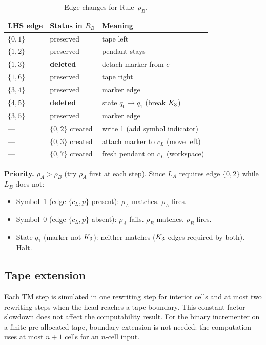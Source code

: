 \documentclass{../shared/primo}
\begin{document}
\begin{table}[ht]
\centering
\begin{tabular}{lll}
\toprule
LHS edge & Status in $R_B$ & Meaning \\
\midrule
$\{0,1\}$ & preserved & tape left \\
$\{1,2\}$ & preserved & pendant stays \\
$\{1,3\}$ & \textbf{deleted} & detach marker from $c$ \\
$\{1,6\}$ & preserved & tape right \\
$\{3,4\}$ & preserved & marker edge \\
$\{4,5\}$ & \textbf{deleted} & state $q_0 \to q_1$ (break $K_{3}$) \\
$\{3,5\}$ & preserved & marker edge \\
---      & $\{0,2\}$ created & write 1 (add symbol indicator) \\
---      & $\{0,3\}$ created & attach marker to $c_L$ (move left) \\
---      & $\{0,7\}$ created & fresh pendant on $c_L$ (workspace) \\
\bottomrule
\end{tabular}
\caption{Edge changes for Rule~$\rho_B$.}
\label{tab:ruleB}
\end{table}

\textbf{Priority.} $\rho_A > \rho_B$ (try $\rho_A$ first at each step). Since $L_A$ requires edge $\{0,2\}$ while $L_B$ does not:
\begin{itemize}
\item Symbol~1 (edge $\{c_L, p\}$ present): $\rho_A$ matches. $\rho_A$ fires.
\item Symbol~0 (edge $\{c_L, p\}$ absent): $\rho_A$ fails. $\rho_B$ matches. $\rho_B$ fires.
\item State $q_1$ (marker not $K_{3}$): neither matches ($K_{3}$ edges required by both). Halt.
\end{itemize}

\subsection{Tape extension}

Each TM step is simulated in one rewriting step for interior cells and at most two rewriting steps when the head reaches a tape boundary. This constant-factor slowdown does not affect the computability result. For the binary incrementer on a finite pre-allocated tape, boundary extension is not needed: the computation uses at most $n + 1$ cells for an $n$-cell input.
\end{document}

